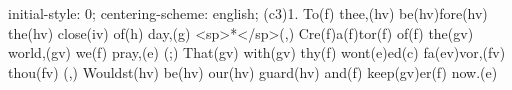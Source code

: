 initial-style: 0;
centering-scheme: english;
(c3)1. To(f) thee,(hv) be(hv)fore(hv) the(hv) close(iv) of(h) day,(g) <sp>*</sp>(,)
Cre(f)a(f)tor(f) of(f) the(gv) world,(gv) we(f) pray,(e) (;)
That(gv) with(gv) thy(f) wont(e)ed(c) fa(ev)vor,(fv) thou(fv) (,)
Wouldst(hv) be(hv) our(hv) guard(hv) and(f) keep(gv)er(f) now.(e)
